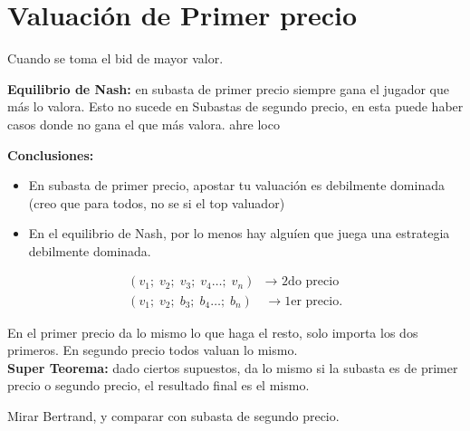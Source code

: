 

\section{Valuación de Primer precio}
Cuando se toma el bid de mayor valor.	

\textbf{Equilibrio de Nash:} en subasta de primer precio siempre gana el jugador que más lo valora. Esto no sucede en Subastas de segundo precio, en esta puede haber casos donde no gana el que más valora. ahre loco

\textbf{Conclusiones: } 
\begin{itemize}
	\item En subasta de primer precio, apostar tu valuación es debilmente dominada (creo que para todos, no se si el top valuador)
	\item   En el equilibrio de Nash, por lo menos hay alguíen que juega una estrategia
		debilmente dominada.
\end{itemize}

\begin{align*}
	(v_1;\; v_2;\; v_3 ;\; v_4\ldots ;\; v_n)  &\to  \text{ 2do precio } \\
	(v_1;\; v_2;\; b_3 ;\; b_4 \ldots ;\; b_n)  &\to  \text{1er precio} 
.\end{align*}

En el primer precio da lo mismo lo que haga el resto, solo importa los dos primeros. En segundo precio
todos valuan lo mismo.  \\[0.2cm] 

\textbf{Super Teorema:} dado ciertos supuestos, da lo mismo si la subasta es de primer precio o segundo precio, el resultado final es el mismo.


Mirar Bertrand, y comparar con subasta de segundo precio.







